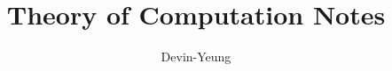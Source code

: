 \documentclass{article}
\title{Theory of Computation Notes}
\author{Devin-Yeung}
\begin{document}
\maketitle
\tableofcontents
\clearpage






\clearpage


\nocite{*}


\end{document}
